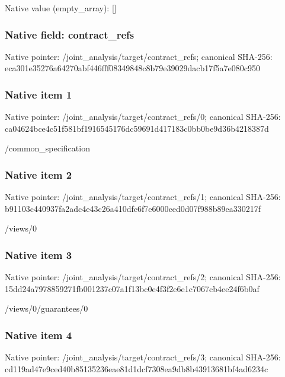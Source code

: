 \documentclass[10pt,a4paper]{article}
\begin{document}
Native value (empty\_\allowbreak{}array): []

\subsubsection{Native field: contract\_\allowbreak{}refs}
Native pointer: /joint\_\allowbreak{}analysis/target/contract\_\allowbreak{}refs; canonical SHA-256: eca301e35276a64270abf446fff08349848c8b79e39029dacb17f5a7e080c950

\subsubsection{Native item 1}
Native pointer: /joint\_\allowbreak{}analysis/target/contract\_\allowbreak{}refs/0; canonical SHA-256: ca04624bce4c51f581bf1916545176dc59691d417183c0bb0be9d36b4218387d

\begingroup\raggedright\sloppy /\allowbreak{}common\_\allowbreak{}specification\par\endgroup

\subsubsection{Native item 2}
Native pointer: /joint\_\allowbreak{}analysis/target/contract\_\allowbreak{}refs/1; canonical SHA-256: b91103c440937fa2adc4e43c26a410dfc6f7e6000ced0d07f988b89ea330217f

\begingroup\raggedright\sloppy /\allowbreak{}views/\allowbreak{}0\par\endgroup

\subsubsection{Native item 3}
Native pointer: /joint\_\allowbreak{}analysis/target/contract\_\allowbreak{}refs/2; canonical SHA-256: 15dd24a7978859271fb001237c07a1f13bc0e4f3f2e6e1c7067cb4ee24f6b0af

\begingroup\raggedright\sloppy /\allowbreak{}views/\allowbreak{}0/\allowbreak{}guarantees/\allowbreak{}0\par\endgroup

\subsubsection{Native item 4}
Native pointer: /joint\_\allowbreak{}analysis/target/contract\_\allowbreak{}refs/3; canonical SHA-256: cd119ad47e9ced40b85135236eae81d1dcf7308ea9db8b43913681bf4ad6234c
\end{document}
